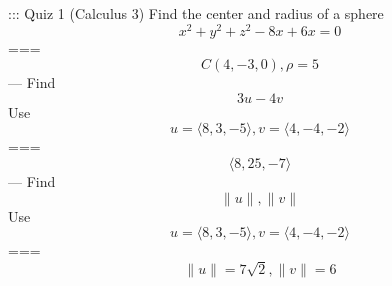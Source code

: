 ::: Quiz 1 (Calculus 3)
Find the center and radius of a sphere
$$ x^2+y^2+z^2-8x+6x=0 $$
===
$$ C(4,-3,0), \rho = 5 $$
---
Find $$ 3u-4v $$
Use $$ u = \langle 8,3,-5 \rangle , v = \langle 4,-4,-2 \rangle $$
===
$$ \langle 8,25,-7 \rangle $$
---
Find $$ \|u\| , \|v\| $$
Use $$ u = \langle 8,3,-5 \rangle , v = \langle 4,-4,-2 \rangle $$
===
$$ \|u\| = 7\sqrt 2 , \|v\| = 6 $$

